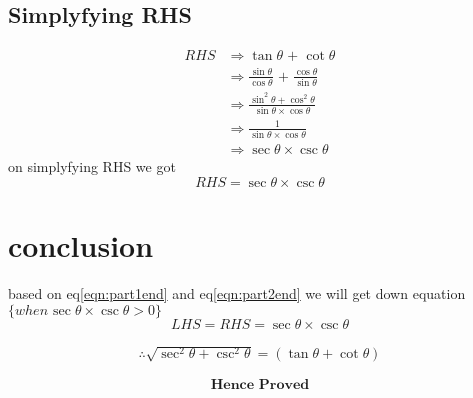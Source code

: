 \documentclass[12pt,twocolumn]{article}
\begin{document}
\subsection*{Simplyfying RHS}
 \begin{align}
  RHS&\Rightarrow \tan{\theta}\hspace{1pt}+\hspace{1pt}\cot{\theta}  \\
     &\Rightarrow  \frac{\sin{\theta}}{\cos{\theta}}\hspace{1pt}+\hspace{1pt}\frac{\cos{\theta}}{\sin{\theta}} \\
     &\Rightarrow \frac{\sin^2{\theta}+\cos^2{\theta}}{\sin{\theta}\times\cos{\theta}}\\
     &\Rightarrow \frac{1}{\sin{\theta}\times\cos{\theta}}\\
     &\Rightarrow \sec{\theta}\times\csc{\theta}
 \end{align}
on simplyfying RHS we got
\begin{equation}
\label{eqn:part2end}
RHS =  \sec{\theta}\times\csc{\theta}
\end{equation}

\section*{conclusion}
 based on eq\ref{eqn:part1end} and eq\ref{eqn:part2end} we will get down equation
 $\{ when \hspace{1pt} \sec{\theta}\times\csc{\theta} >0\}$
 \begin{equation}
 LHS = RHS =   \sec{\theta}\times\csc{\theta}
  \end{equation}
 

\begin{align*}
\therefore\sqrt{\sec^2{\theta}+\csc^2{\theta}}=(\tan{\theta}+\cot{\theta})
\end{align*}


\[\textbf{Hence Proved}\]
\end{document}
